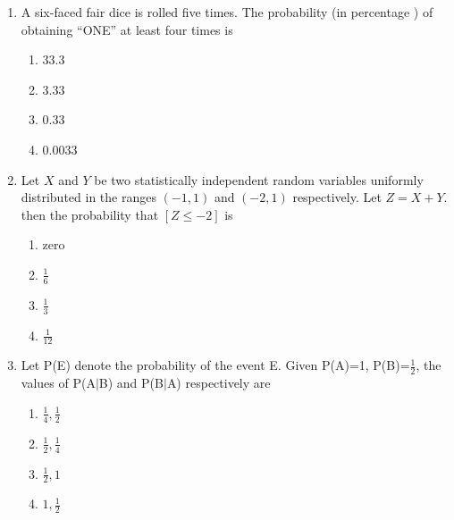 \documentclass[journal,12pt,twocolumn]{IEEEtran}
\begin{document}
\begin{enumerate}
\solution

%
\item A six-faced fair dice is rolled five times. The probability (in percentage ) of obtaining “ONE” at least four times is 
\begin{enumerate}
    \item 33.3
    \item 3.33
    \item 0.33
    \item 0.0033
\end{enumerate}
%
\solution

%
\item Let $X$ and $Y$ be two statistically independent random variables uniformly
distributed in the ranges $(-1,1)$ and $(-2,1)$ respectively. Let $Z = X + Y.$ then the probability that $[Z\leq-2]$ is
\begin{enumerate}[label=\alph*)]
\item zero
\item $\frac{1}{6}$
\item $\frac{1}{3}$
\item $\frac{1}{12}$
\end{enumerate}
%
\solution

%
\item Let P(E) denote the probability of the event E. Given P(A)=1, P(B)=$\frac{1}{2}$, the values of P(A$|$B) and P(B$|$A) respectively are
%
\begin{enumerate}
    \item $\frac{1}{4},\frac{1}{2}$
    \item $\frac{1}{2},\frac{1}{4}$
    \item $\frac{1}{2},1$
    \item $1,\frac{1}{2}$
\end{enumerate}
%
\solution

%


\end{enumerate}
\end{document}
